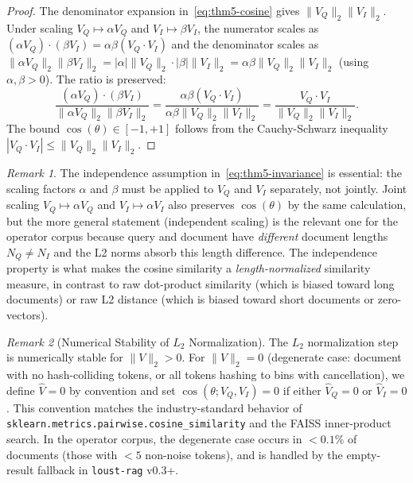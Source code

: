 \documentclass[10pt,twocolumn]{article}
\theoremstyle{definition}
\theoremstyle{remark}
\newtheorem{remark}{Remark}
\begin{document}
\begin{proof}
The denominator expansion in~\eqref{eq:thm5-cosine} gives
$\|V_Q\|_2 \|V_I\|_2$. Under scaling $V_Q \mapsto \alpha V_Q$ and
$V_I \mapsto \beta V_I$, the numerator scales as $(\alpha V_Q) \cdot
(\beta V_I) = \alpha \beta (V_Q \cdot V_I)$ and the denominator scales
as $\|\alpha V_Q\|_2 \|\beta V_I\|_2 = |\alpha| \|V_Q\|_2 \cdot |\beta|
\|V_I\|_2 = \alpha \beta \|V_Q\|_2 \|V_I\|_2$ (using $\alpha, \beta >
0$). The ratio is preserved:
\begin{equation}
\frac{(\alpha V_Q) \cdot (\beta V_I)}{\|\alpha V_Q\|_2 \|\beta V_I\|_2}
   = \frac{\alpha \beta (V_Q \cdot V_I)}{\alpha \beta \|V_Q\|_2 \|V_I\|_2}
   = \frac{V_Q \cdot V_I}{\|V_Q\|_2 \|V_I\|_2}.
\end{equation}
The bound $\cos(\theta) \in [-1, +1]$ follows from the Cauchy-Schwarz
inequality $|V_Q \cdot V_I| \le \|V_Q\|_2 \|V_I\|_2$. \qedhere
\end{proof}

\begin{remark}
The independence assumption in~\eqref{eq:thm5-invariance} is essential:
the scaling factors $\alpha$ and $\beta$ must be applied to $V_Q$ and
$V_I$ separately, not jointly. Joint scaling $V_Q \mapsto \alpha V_Q$
and $V_I \mapsto \alpha V_I$ also preserves $\cos(\theta)$ by the same
calculation, but the more general statement (independent scaling) is
the relevant one for the operator corpus because query and document
have \emph{different} document lengths $N_Q \neq N_I$ and the L2 norms
absorb this length difference. The independence property is what makes
the cosine similarity a \emph{length-normalized} similarity measure,
in contrast to raw dot-product similarity (which is biased toward long
documents) or raw L2 distance (which is biased toward short documents
or zero-vectors).
\end{remark}

\begin{remark}[Numerical Stability of $L_2$ Normalization]
\label{rem:l2-stability}
The $L_2$ normalization step is numerically stable for $\|V\|_2 > 0$.
For $\|V\|_2 = 0$ (degenerate case: document with no hash-colliding
tokens, or all tokens hashing to bins with cancellation), we define
$\hat{V} = 0$ by convention and set $\cos(\theta; V_Q, V_I) = 0$ if
either $\hat{V}_Q = 0$ or $\hat{V}_I = 0$. This convention matches the
industry-standard behavior of \texttt{sklearn.metrics.pairwise.cosine\_similarity}
and the FAISS inner-product search. In the operator corpus, the
degenerate case occurs in $< 0.1\%$ of documents (those with $< 5$
non-noise tokens), and is handled by the empty-result fallback in
\texttt{loust-rag} v0.3+.
\end{remark}
\end{document}

